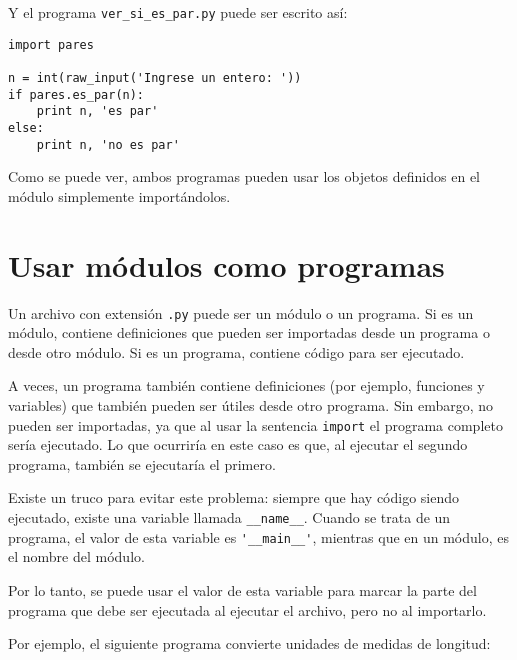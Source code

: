 Y el programa \lstinline!ver_si_es_par.py! puede ser escrito así:

\begin{lstlisting}
import pares

n = int(raw_input('Ingrese un entero: '))
if pares.es_par(n):
    print n, 'es par'
else:
    print n, 'no es par'
\end{lstlisting}

Como se puede ver, ambos programas pueden usar los objetos definidos en
el módulo simplemente importándolos.

\section{Usar módulos como programas}

Un archivo con extensión \lstinline!.py! puede ser un módulo o un
programa. Si es un módulo, contiene definiciones que pueden ser
importadas desde un programa o desde otro módulo. Si es un programa,
contiene código para ser ejecutado.

A veces, un programa también contiene definiciones (por ejemplo,
funciones y variables) que también pueden ser útiles desde otro
programa. Sin embargo, no pueden ser importadas, ya que al usar la
sentencia \lstinline!import! el programa completo sería ejecutado. Lo
que ocurriría en este caso es que, al ejecutar el segundo programa,
también se ejecutaría el primero.

Existe un truco para evitar este problema: siempre que hay código siendo
ejecutado, existe una variable llamada \lstinline!__name__!. Cuando se
trata de un programa, el valor de esta variable es
\lstinline!'__main__'!, mientras que en un módulo, es el nombre del
módulo.

Por lo tanto, se puede usar el valor de esta variable para marcar la
parte del programa que debe ser ejecutada al ejecutar el archivo, pero
no al importarlo.

Por ejemplo, el siguiente programa convierte unidades de medidas de
longitud:

